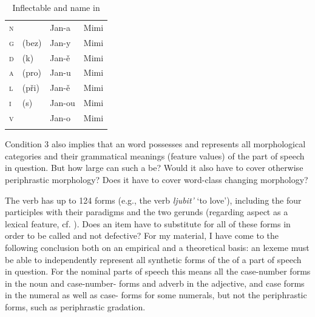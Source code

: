 \documentclass[output=paper,colorlinks,citecolor=brown]{langscibook}
\begin{document}
\begin{table}[ht]
	\centering
	\begin{tabularx}{0.45\textwidth}{p{0.5cm}XXX}
		\lsptoprule
		\textsc{n} & & Jan-a & Mimi \\
		\textsc{g} & (bez) & Jan-y & Mimi \\
		\textsc{d} & (k) & Jan-ě & Mimi \\
		\textsc{a} & (pro) & Jan-u & Mimi \\
		\textsc{l} & (při) & Jan-ě & Mimi \\
		\textsc{i} & (s) & Jan-ou & Mimi \\
		\textsc{v} & & Jan-o & Mimi \\
		\lspbottomrule
	\end{tabularx}
	\caption{Inflectable and  name in }
	\label{03tab3}
\end{table}

Condition 3 also implies that an  word possesses and represents all morphological categories and their grammatical meanings (feature values) of the part of speech in question. But how large can such a  be? Would it also have to cover otherwise periphrastic morphology? Does it have to cover word-class changing morphology?

The  verb  has up to 124 forms (e.g., the verb \emph{ljubit'} `to love'), including the four participles with their paradigms and the two gerunds (regarding aspect as a lexical feature, cf. \citealt{genis2021}). Does an  item have to substitute for all of these forms in order to be called  and not defective? For my material, I have come to the following conclusion both on an empirical and a theoretical basis: an  lexeme must be able to independently represent all synthetic forms of the  of a part of speech in question. For the nominal parts of speech this means all the case-number forms in the noun and case-number- forms and adverb in the adjective, and case forms in the numeral as well as case- forms for some numerals, but not the periphrastic forms, such as periphrastic gradation.
\end{document}
